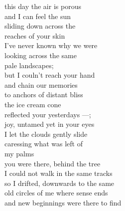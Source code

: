 this day the air is porous\\
and I can feel the sun\\
sliding down across the\\
reaches of your skin\\
I've never known why we were\\
looking across the same\\
pale landscapes; \\
but I couln't reach your hand\\
and chain our memories\\
to anchors of distant bliss\\

the ice cream cone\\
reflected your yesterdays ---;\\
joy, untamed yet in your eyes\\
I let the clouds gently slide\\
caressing what was left of\\
my palms\\

you were there, behind the tree\\
I could not walk in the same tracks\\
so I drifted, downwards to the same\\
old circles of me where sense ends\\
and new beginnings were there to find\\
